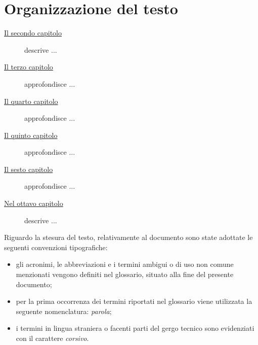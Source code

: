 \section{Organizzazione del testo}

\begin{description}
    \item[{\hyperref[cap:processi-metodologie]{Il secondo capitolo}}] descrive ...
    
    \item[{\hyperref[cap:progettazione]{Il terzo capitolo}}] approfondisce ...
    
    \item[{\hyperref[cap:descrizione-stage]{Il quarto capitolo}}] approfondisce ...
    
    \item[{\hyperref[cap:analisi-requisiti]{Il quinto capitolo}}] approfondisce ...
    
    \item[{\hyperref[cap:tecnologie-strumenti]{Il sesto capitolo}}] approfondisce ...
    
    \item[{\hyperref[cap:conclusioni]{Nel ottavo capitolo}}] descrive ...
\end{description}

Riguardo la stesura del testo, relativamente al documento sono state adottate le seguenti convenzioni tipografiche:
\begin{itemize}
	\item gli acronimi, le abbreviazioni e i termini ambigui o di uso non comune menzionati vengono definiti nel glossario, situato alla fine del presente documento;
	\item per la prima occorrenza dei termini riportati nel glossario viene utilizzata la seguente nomenclatura: \emph{parola}\glsfirstoccur;
	\item i termini in lingua straniera o facenti parti del gergo tecnico sono evidenziati con il carattere \emph{corsivo}.
\end{itemize}